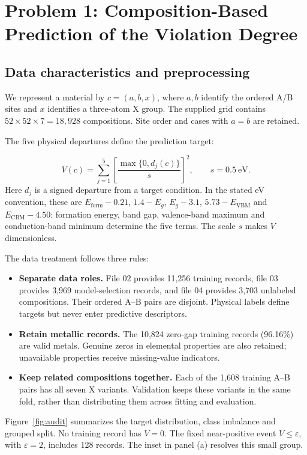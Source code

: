 \section{Problem 1: Composition-Based Prediction of the Violation Degree}
\subsection{Data characteristics and preprocessing}
We represent a material by $c=(a,b,x)$, where $a,b$ identify the ordered A/B sites and $x$ identifies a three-atom X group. The supplied grid contains $52\times52\times7=18{,}928$ compositions. Site order and cases with $a=b$ are retained.

The five physical departures define the prediction target:
\begin{samepage}
\begin{equation}
 V(c)=\sum_{j=1}^{5}\left[\frac{\max\{0,d_j(c)\}}{s}\right]^2,
 \qquad s=0.5\ \mathrm{eV}.
 \label{eq:violation}
\end{equation}
\noindent Here $d_j$ is a signed departure from a target condition. In the stated eV convention, these are $E_{\mathrm{form}}-0.21$, $1.4-E_g$, $E_g-3.1$, $5.73-E_{\mathrm{VBM}}$ and $E_{\mathrm{CBM}}-4.50$: formation energy, band gap, valence-band maximum and conduction-band minimum determine the five terms. The scale $s$ makes $V$ dimensionless.
\end{samepage}

The data treatment follows three rules:
\begin{itemize}
  \item \textbf{Separate data roles.} File 02 provides 11,256 training records, file 03 provides 3,969 model-selection records, and file 04 provides 3,703 unlabeled compositions. Their ordered A--B pairs are disjoint. Physical labels define targets but never enter predictive descriptors.
  \item \textbf{Retain metallic records.} The 10,824 zero-gap training records (96.16\%) are valid metals. Genuine zeros in elemental properties are also retained; unavailable properties receive missing-value indicators.
  \item \textbf{Keep related compositions together.} Each of the 1,608 training A--B pairs has all seven X variants. Validation keeps these variants in the same fold, rather than distributing them across fitting and evaluation.
\end{itemize}

Figure~\ref{fig:audit} summarizes the target distribution, class imbalance and grouped split. No training record has $V=0$. The fixed near-positive event $V\le\varepsilon$, with $\varepsilon=2$, includes 128 records. The inset in panel (a) resolves this small group.
\FloatBarrier

